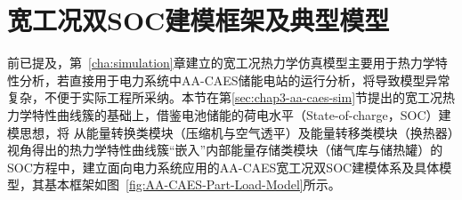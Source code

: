 
\section{宽工况双SOC建模框架及典型模型}
\label{sec:dual-SOC}
前已提及，第~\ref{cha:simulation}章建立的宽工况热力学仿真模型主要用于热力学特性分析，若直接用于电力系统中AA-CAES储能电站的运行分析，将导致模型异常复杂，不便于实际工程所采纳。本节在第\ref{sec:chap3-aa-caes-sim}节提出的宽工况热力学特性曲线簇的基础上，借鉴电池储能的荷电水平（State-of-charge，SOC）建模思想，将
从能量转换类模块（压缩机与空气透平）及能量转移类模块（换热器）视角得出的热力学特性曲线簇“嵌入”内部能量存储类模块（储气库与储热罐）的SOC方程中，建立面向电力系统应用的AA-CAES宽工况双SOC建模体系及具体模型，其基本框架如图~\ref{fig:AA-CAES-Part-Load-Model}所示。

